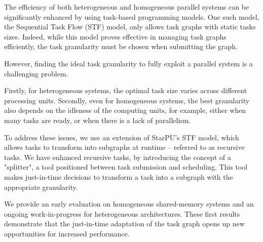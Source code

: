 The efficiency of both heterogeneous and homogeneous parallel systems can be significantly enhanced by using task-based programming models. One such model, the Sequential Task Flow (STF) model, only allows task graphs with static tasks sizes. Indeed, while this model proves effective in managing task graphs efficiently, the task granularity must be chosen when submitting the graph.

However, finding the ideal task granularity to fully exploit a parallel system is a challenging problem.

Firstly, for heterogeneous systems, the optimal task size varies across different processing units. Secondly, even for homogeneous systems, the best granularity also depends on the idleness of the computing units, for example, either when many tasks are ready, or when there is a lack of parallelism.

To address these issues, we use an extension of StarPU's STF model, which allows tasks to transform into subgraphs at runtime -- referred to as recursive tasks. We have enhanced recursive tasks, by introducing the concept of a "splitter", a tool positioned between task submission and scheduling. This tool makes just-in-time decisions to transform a task into a subgraph with the appropriate granularity.

We provide an early evaluation on homogeneous shared-memory systems and an ongoing work-in-progress for heterogeneous architectures. These first results demonstrate that the just-in-time adaptation of the task graph opens up new opportunities for increased performance.
